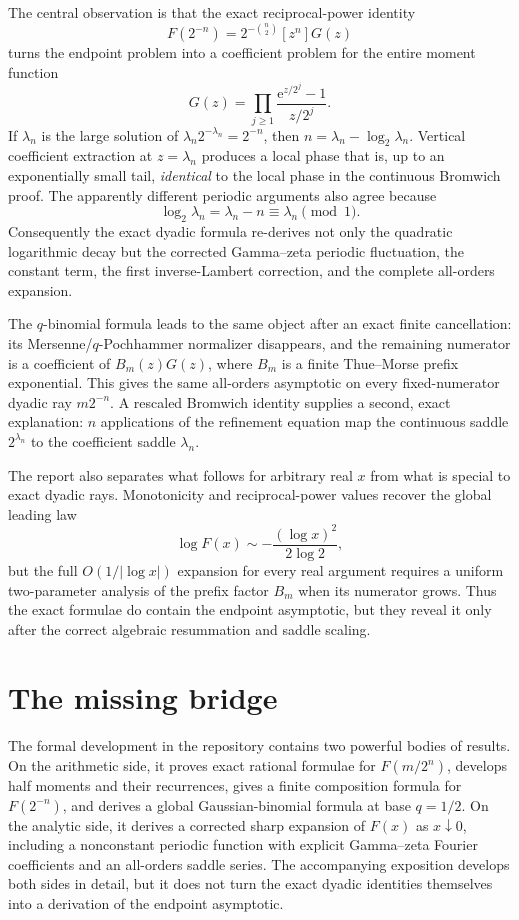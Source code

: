\documentclass[11pt,oneside]{article}
\theoremstyle{definition}
\theoremstyle{remark}
\newcommand{\e}{\mathrm e}
\begin{document}
The central observation is that the exact reciprocal-power identity
\[
 F(2^{-n})=2^{-\binom n2}[z^n]G(z)
\]
turns the endpoint problem into a coefficient problem for the entire moment function
\[
 G(z)=\prod_{j\ge1}\frac{\e^{z/2^j}-1}{z/2^j}.
\]
If $\lambda_n$ is the large solution of $\lambda_n2^{-\lambda_n}=2^{-n}$, then
$n=\lambda_n-\log_2\lambda_n$.  Vertical coefficient extraction at $z=\lambda_n$ produces a local phase that is, up to an exponentially small tail, \emph{identical} to the local phase in the continuous Bromwich proof.  The apparently different periodic arguments also agree because
\[
 \log_2\lambda_n=\lambda_n-n\equiv\lambda_n\pmod 1.
\]
Consequently the exact dyadic formula re-derives not only the quadratic logarithmic decay but the corrected Gamma--zeta periodic fluctuation, the constant term, the first inverse-Lambert correction, and the complete all-orders expansion.

The $q$-binomial formula leads to the same object after an exact finite cancellation: its Mersenne/$q$-Pochhammer normalizer disappears, and the remaining numerator is a coefficient of $B_m(z)G(z)$, where $B_m$ is a finite Thue--Morse prefix exponential.  This gives the same all-orders asymptotic on every fixed-numerator dyadic ray $m2^{-n}$.  A rescaled Bromwich identity supplies a second, exact explanation: $n$ applications of the refinement equation map the continuous saddle $2^{\lambda_n}$ to the coefficient saddle $\lambda_n$.

The report also separates what follows for arbitrary real $x$ from what is special to exact dyadic rays.  Monotonicity and reciprocal-power values recover the global leading law
\[
 \log F(x)\sim-\frac{(\log x)^2}{2\log2},
\]
but the full $O(1/|\log x|)$ expansion for every real argument requires a uniform two-parameter analysis of the prefix factor $B_m$ when its numerator grows.  Thus the exact formulae do contain the endpoint asymptotic, but they reveal it only after the correct algebraic resummation and saddle scaling.


\section{The missing bridge}
\label{dyadicasymbridge:sec:introduction}

The formal development in the repository \cite{dyadicasymbridge:proveit} contains two powerful bodies of results.
On the arithmetic side, it proves exact rational formulae for $F(m/2^n)$, develops half moments and their recurrences, gives a finite composition formula for $F(2^{-n})$, and derives a global Gaussian-binomial formula at base $q=1/2$.  On the analytic side, it derives a corrected sharp expansion of $F(x)$ as $x\downarrow0$, including a nonconstant periodic function with explicit Gamma--zeta Fourier coefficients and an all-orders saddle series.  The accompanying exposition \cite{dyadicasymbridge:masterdoc} develops both sides in detail, but it does not turn the exact dyadic identities themselves into a derivation of the endpoint asymptotic.
\end{document}
